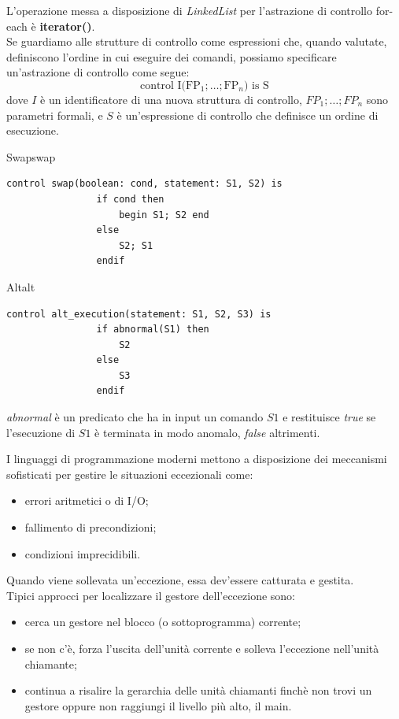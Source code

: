 \documentclass[12pt]{report}
\newcommand{\nmu}{}
\begin{document}
 	L'operazione messa a disposizione di \textit{LinkedList} per l'astrazione di controllo for-each è \textbf{iterator()}. \\
 	Se guardiamo alle strutture di controllo come espressioni che, quando valutate, definiscono l'ordine in cui eseguire dei comandi, possiamo specificare un'astrazione di controllo come segue:
 	\[
 	\text{control I(FP$_1; \dots; $FP$_n$) is S}
 	\]
 	dove $I$ è un identificatore di una nuova struttura di controllo, $FP_1;\dots;FP_n$ sono parametri formali, e $S$ è un'espressione di controllo che definisce un ordine di esecuzione.
 	\begin{example}{\nmu Swap}{swap}
 		\begin{lstlisting}[style=pascalstyle]
 			control swap(boolean: cond, statement: S1, S2) is
 				if cond then
 					begin S1; S2 end
 				else
 					S2; S1
 				endif\end{lstlisting}
 	\end{example}
 	\begin{example}{\nmu Alt}{alt}
 		\begin{lstlisting}[style=pascalstyle]
 			control alt_execution(statement: S1, S2, S3) is
 				if abnormal(S1) then
 					S2
 				else
 					S3
 				endif\end{lstlisting}
 				\textit{abnormal} è un predicato che ha in input un comando $S1$ e restituisce \textit{true} se l'esecuzione di $S1$ è terminata in modo anomalo, \textit{false} altrimenti.
 	\end{example}
 	I linguaggi di programmazione moderni mettono a disposizione dei meccanismi sofisticati per gestire le situazioni eccezionali come:
 	\begin{itemize}
 		\item errori aritmetici o di I/O;
 		\item fallimento di precondizioni;
 		\item condizioni imprecidibili.
 	\end{itemize}
 	Quando viene sollevata un'eccezione, essa dev'essere catturata e gestita. \\
 	Tipici approcci per localizzare il gestore dell'eccezione sono:
 	\begin{itemize}
 		\item cerca un gestore nel blocco (o sottoprogramma) corrente;
 		\item se non c'è, forza l'uscita dell'unità corrente e solleva l'eccezione nell'unità chiamante;
 		\item continua a risalire la gerarchia delle unità chiamanti finchè non trovi un gestore oppure non raggiungi il livello più alto, il main.
 	\end{itemize}
\end{document}
